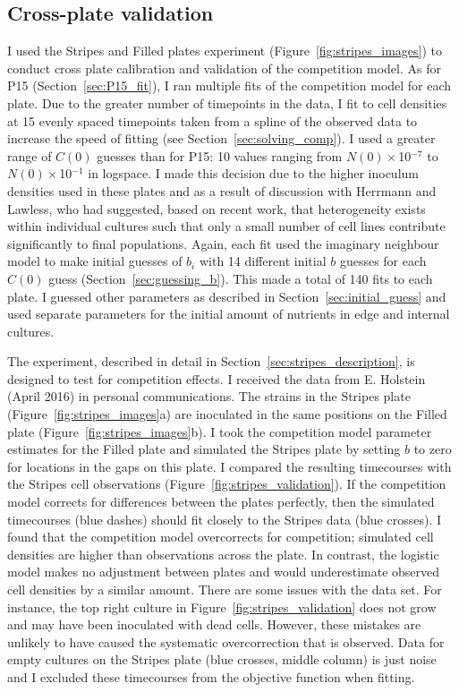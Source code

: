 \begin{multicols}{2}

\subsection{Cross-plate validation}
\label{sec:cross_plate_val_results}

I used the Stripes and Filled plates experiment
(Figure~\ref{fig:stripes_images}) to conduct cross plate calibration
and validation of the competition model. As for P15
(Section~\ref{sec:P15_fit}), I ran multiple fits of the competition
model for each plate. Due to the greater number of timepoints in the
data, I fit to cell densities at 15 evenly spaced timepoints taken
from a spline of the observed data to increase the speed of fitting
(see Section~\ref{sec:solving_comp}). I used a greater range of
\(C(0)\) guesses than for P15: 10 values ranging from
\(N(0)\times\)10\(^{-7}\) to \(N(0)\times\)10\(^{-1}\) in logspace. I
made this decision due to the higher inoculum densities used in these
plates and as a result of discussion with Herrmann and Lawless, who
had suggested, based on recent work, that heterogeneity exists within
individual cultures such that only a small number of cell lines
contribute significantly to final populations. Again, each fit used
the imaginary neighbour model to make initial guesses of \(b_{i}\)
with 14 different initial \(b\) guesses for each \(C(0)\) guess
(Section~\ref{sec:guessing_b}). This made a total of 140 fits to each
plate. I guessed other parameters as described in
Section~\ref{sec:initial_guess} and used separate parameters for the
initial amount of nutrients in edge and internal cultures.

The experiment, described in detail in
Section~\ref{sec:stripes_description}, is designed to test for
competition effects. I received the data from E. Holstein (April 2016)
in personal communications. The strains in the Stripes plate
(Figure~\ref{fig:stripes_images}a) are inoculated in the same
positions on the Filled plate (Figure~\ref{fig:stripes_images}b). I
took the competition model parameter estimates for the Filled plate
and simulated the Stripes plate by setting \(b\) to zero for locations
in the gaps on this plate. I compared the resulting timecourses with
the Stripes cell observations
(Figure~\ref{fig:stripes_validation}). If the competition model
corrects for differences between the plates perfectly, then the
simulated timecourses (blue dashes) should fit closely to the Stripes
data (blue crosses). I found that the competition model overcorrects
for competition; simulated cell densities are higher than observations
across the plate. In contrast, the logistic model makes no adjustment
between plates and would underestimate observed cell densities by a
similar amount. There are some issues with the data set. For instance,
the top right culture in Figure~\ref{fig:stripes_validation} does not
grow and may have been inoculated with dead cells. However, these
mistakes are unlikely to have caused the systematic overcorrection
that is observed. Data for empty cultures on the Stripes plate (blue
crosses, middle column) is just noise and I excluded these timecourses
from the objective function when fitting.


\end{multicols}
